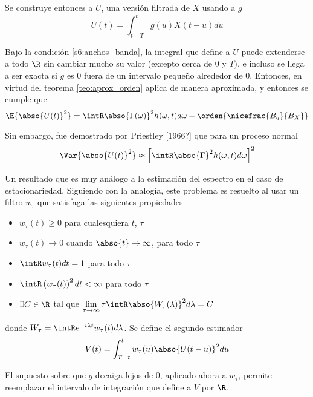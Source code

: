 Se construye entonces a $U$, una versión filtrada de $X$ usando a $g$
\begin{equation}
U(t) = \int_{t-T}^{t} g(u) X(t-u) du
\end{equation}

Bajo la condición \ref{s6:anchos_banda}, la integral que define a $U$ puede extenderse a todo $\R$ sin cambiar mucho su valor (excepto cerca de 0 y $T$), e incluso se llega a ser exacta si $g$ es 0 fuera de un intervalo pequeño alrededor de 0. Entonces, en virtud del teorema \ref{teo:aprox_orden}
aplica de manera aproximada, y entonces se cumple que
\begin{equation}
\E{\abso{U(t)}^{2}} = \intR \abso{\Gamma(\omega)}^{2} h(\omega, t)d\omega + \orden{\nicefrac{B_g}{B_X}}
\end{equation}

Sin embargo, fue demostrado por Priestley [1966?] que para un proceso normal
\begin{equation}
\Var{\abso{U(t)}^{2}} \approx \left[ \intR \abso{\Gamma}^{2} h(\omega, t)d\omega \right]^{2}
\end{equation}

Un resultado que es muy análogo a la estimación del espectro en el caso de estacionariedad.
%
Siguiendo con la analogía, este problema es resuelto al usar un filtro $w_\tau$ que satisfaga las siguientes propiedades
\begin{itemize}
\item $w_\tau(t) \geq 0$ para cualesquiera $t$, $\tau$
\item $w_\tau(t) \rightarrow 0$ cuando $\abso{t} \rightarrow \infty$, para todo $\tau$
\item $\displaystyle \intR w_\tau(t) dt = 1$ para todo $\tau$
\item $\displaystyle \intR \left( w_\tau(t) \right)^{2} dt < \infty$ para todo $\tau$
\item $\exists C \in \R$ tal que  
$\displaystyle \lim_{\tau\rightarrow\infty} \tau \intR \abso{ W_{\tau}(\lambda) }^{2} d\lambda = C$
\end{itemize}
donde $W_\tau = \intR e^{-i \lambda t} w_\tau(t) d\lambda$. Se define el segundo estimador
\begin{equation}
V(t) = \int_{T-t}^{t} w_\tau (u) \abso{U(t-u)}^{2} du
\label{estimador_doble_ventana}
\end{equation}

El supuesto sobre que $g$ decaiga lejos de 0, aplicado ahora a $w_\tau$, permite reemplazar el intervalo de integración que define a $V$ por $\R$. 

